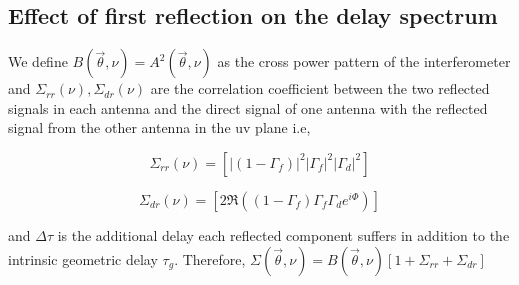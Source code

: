 \documentclass[12pt,preprint]{aastex}
\begin{document}
 
\subsection{Effect of first reflection on the delay spectrum}
We define $B(\vec \theta, \nu) =  A^{2}(\vec \theta, \nu) $ as the cross power pattern of the interferometer and $\Sigma_{rr}(\nu), \Sigma_{dr}(\nu)$ are the correlation coefficient between the two reflected signals in each antenna and the direct signal of one antenna with the reflected signal from the other antenna in the uv plane i.e, 

\begin{equation}
\Sigma_{rr}(\nu) =  \left [ |(1-\Gamma_{f})|^{2}|\Gamma_{f}|^{2}|\Gamma_{d}|^{2} \right ]
\end{equation}

\begin{equation}
\Sigma_{dr}(\nu) = \left [ 2 \Re \left ((1-\Gamma_{f})\Gamma_{f}\Gamma_{d} e^{i\Phi} \right) \right]
\end{equation}

and $\Delta \tau$ is the additional delay each reflected component suffers in addition to the intrinsic geometric delay 
$\tau_{g}$. Therefore, $\Sigma(\vec \theta, \nu) = B(\vec \theta, \nu) \left [ 1+\Sigma_{rr} +\Sigma_{dr} \right]$
\end{document}
